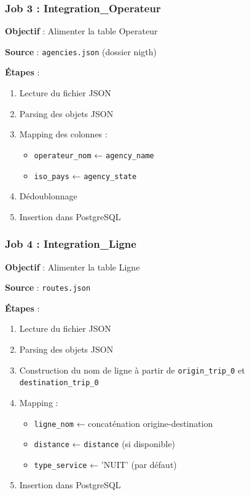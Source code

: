 \documentclass[12pt,a4paper]{article}
\begin{document}
\subsubsection{Job 3 : Integration\_Operateur}

\textbf{Objectif} : Alimenter la table Operateur

\textbf{Source} : \texttt{agencies.json} (dossier nigth)

\textbf{Étapes} :
\begin{enumerate}
    \item Lecture du fichier JSON
    \item Parsing des objets JSON
    \item Mapping des colonnes :
        \begin{itemize}
            \item \texttt{operateur\_nom} ← \texttt{agency\_name}
            \item \texttt{iso\_pays} ← \texttt{agency\_state}
        \end{itemize}
    \item Dédoublonnage
    \item Insertion dans PostgreSQL
\end{enumerate}

\subsubsection{Job 4 : Integration\_Ligne}

\textbf{Objectif} : Alimenter la table Ligne

\textbf{Source} : \texttt{routes.json}

\textbf{Étapes} :
\begin{enumerate}
    \item Lecture du fichier JSON
    \item Parsing des objets JSON
    \item Construction du nom de ligne à partir de \texttt{origin\_trip\_0} et \texttt{destination\_trip\_0}
    \item Mapping :
        \begin{itemize}
            \item \texttt{ligne\_nom} ← concaténation origine-destination
            \item \texttt{distance} ← \texttt{distance} (si disponible)
            \item \texttt{type\_service} ← 'NUIT' (par défaut)
        \end{itemize}
    \item Insertion dans PostgreSQL
\end{enumerate}
\end{document}

